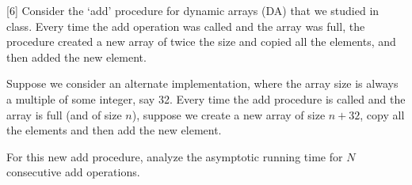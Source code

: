 \documentclass[addpoints, 11pt]{exam}
\begin{document}
\begin{questions}

[6]
Consider the `add' procedure for dynamic arrays (DA) that we studied in class. Every time the add operation was called and the array was full, the procedure created a new array of twice the size and copied all the elements, and then added the new element.

Suppose we consider an alternate implementation, where the array size is always a multiple of some integer, say 32. Every time the add procedure is called and the array is full (and of size $n$), suppose we create a new array of size $n + 32$, copy all the elements and then add the new element.

For this new add procedure, analyze the asymptotic running time for $N$ consecutive add operations. 
\end{questions}
\end{document}
